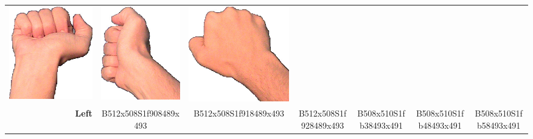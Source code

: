 \documentclass{article}
\begin{document}
\begin{center}
\begin{tabular}{r*{6}{c}}
\includegraphics[scale=0.1]{images/10-04-4.jpg}&
\includegraphics[scale=0.1]{images/10-04-5.jpg}&
\includegraphics[scale=0.1]{images/10-04-6.jpg}\\
\textbf{Left}&
B512x508S1f908489x493&
B512x508S1f918489x493&
B512x508S1f928489x493&
B508x510S1fb38493x491&
B508x510S1fb48493x491&
B508x510S1fb58493x491\\
\end{tabular}
\end{center}
\end{document}
